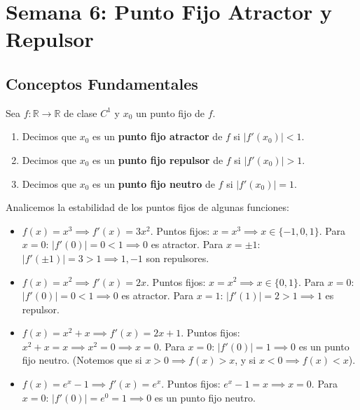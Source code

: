 
\chapter{Semana 6: Punto Fijo Atractor y Repulsor}

\section{Conceptos Fundamentales}

\begin{definicion}
	Sea $f: \mathbb{R} \to \mathbb{R}$ de clase $C^1$ y $x_0$ un punto fijo de $f$.
	\begin{enumerate}[1)]
		\item Decimos que $x_0$ es un \textbf{punto fijo atractor} de $f$ si $|f'(x_0)| < 1$.
		\item Decimos que $x_0$ es un \textbf{punto fijo repulsor} de $f$ si $|f'(x_0)| > 1$.
		\item Decimos que $x_0$ es un \textbf{punto fijo neutro} de $f$ si $|f'(x_0)| = 1$.
	\end{enumerate}
\end{definicion}

\begin{ejemplo}
	Analicemos la estabilidad de los puntos fijos de algunas funciones:
	\begin{itemize}
		\item $f(x) = x^3 \implies f'(x) = 3x^2$. 
		Puntos fijos: $x = x^3 \implies x \in \{-1, 0, 1\}$.
		Para $x=0$: $|f'(0)| = 0 < 1 \implies 0$ es atractor.
		Para $x=\pm 1$: $|f'(\pm 1)| = 3 > 1 \implies 1, -1$ son repulsores.
		
		\item $f(x) = x^2 \implies f'(x) = 2x$. 
		Puntos fijos: $x = x^2 \implies x \in \{0, 1\}$.
		Para $x=0$: $|f'(0)| = 0 < 1 \implies 0$ es atractor.
		Para $x=1$: $|f'(1)| = 2 > 1 \implies 1$ es repulsor.
		
		\item $f(x) = x^2 + x \implies f'(x) = 2x + 1$. 
		Puntos fijos: $x^2 + x = x \implies x^2 = 0 \implies x = 0$.
		Para $x=0$: $|f'(0)| = 1 \implies 0$ es un punto fijo neutro.
		(Notemos que si $x>0 \implies f(x)>x$, y si $x<0 \implies f(x)<x$).
		
		\item $f(x) = e^x - 1 \implies f'(x) = e^x$. 
		Puntos fijos: $e^x - 1 = x \implies x = 0$.
		Para $x=0$: $|f'(0)| = e^0 = 1 \implies 0$ es un punto fijo neutro.
	\end{itemize}
\end{ejemplo}

